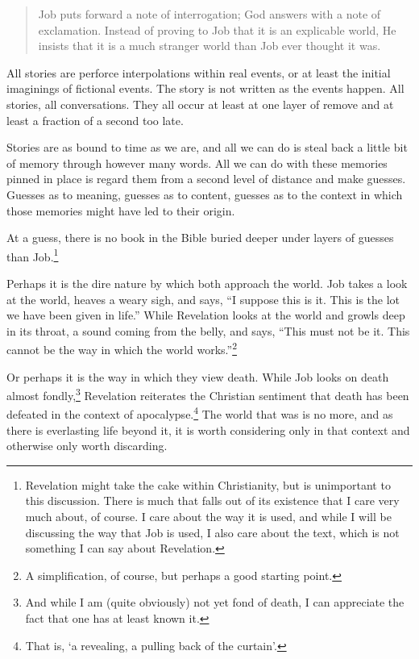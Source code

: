 \begin{quote}
Job puts forward a note of interrogation; God answers with a note of exclamation. Instead of proving to Job that it is an explicable world, He insists that it is a much stranger world than Job ever thought it was.

\parencite{intro-to-job}
\end{quote}

All stories are perforce interpolations within real events, or at least the initial imaginings of fictional events. The story is not written as the events happen. All stories, all conversations. They all occur at least at one layer of remove and at least a fraction of a second too late.

Stories are as bound to time as we are, and all we can do is steal back a little bit of memory through however many words. All we can do with these memories pinned in place is regard them from a second level of distance and make guesses. Guesses as to meaning, guesses as to content, guesses as to the context in which those memories might have led to their origin.

At a guess, there is no book in the Bible buried deeper under layers of guesses than Job.\footnote{Revelation might take the cake within Christianity, but is unimportant to this discussion. There is much that falls out of its existence that I care very much about, of course. I care about the way it is used, and while I will be discussing the way that Job is used, I also care about the text, which is not something I can say about Revelation.}

Perhaps it is the dire nature by which both approach the world. Job takes a look at the world, heaves a weary sigh, and says, ``I suppose this is it. This is the lot we have been given in life.'' While Revelation looks at the world and growls deep in its throat, a sound coming from the belly, and says, ``This must not be it. This cannot be the way in which the world works.''\footnote{A simplification, of course, but perhaps a good starting point.}

Or perhaps it is the way in which they view death. While Job looks on death almost fondly,\footnote{And while I am (quite obviously) not yet fond of death, I can appreciate the fact that one has at least known it.} Revelation reiterates the Christian sentiment that death has been defeated in the context of apocalypse.\footnote{That is, `a revealing, a pulling back of the curtain'.} The world that was is no more, and as there is everlasting life beyond it, it is worth considering only in that context and otherwise only worth discarding.

